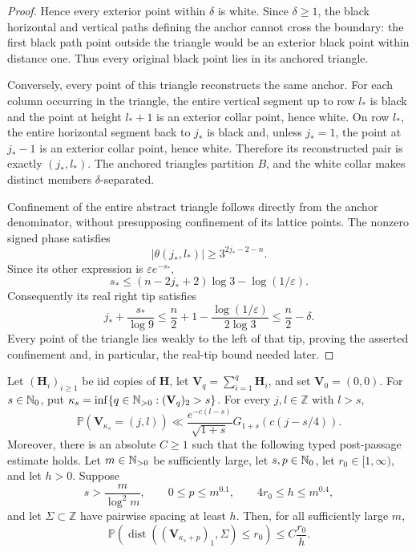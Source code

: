 \begin{proof}
Hence every exterior point within \(\delta\) is white.  Since
\(\delta\ge1\), the black horizontal and vertical paths defining the anchor
cannot cross the boundary: the first black path point outside the triangle
would be an exterior black point within distance one.  Thus every original
black point lies in its anchored triangle.

Conversely, every point of this triangle reconstructs the same anchor.
For each column occurring in the triangle, the entire vertical segment up to
row \(l_*\) is black and the point at height \(l_*+1\) is an exterior collar
point, hence white.  On row \(l_*\), the entire horizontal segment back to
\(j_*\) is black and, unless \(j_*=1\), the point at \(j_*-1\) is an
exterior collar point, hence white.  Therefore its reconstructed pair is
exactly \((j_*,l_*)\).  The anchored triangles partition \(B\), and the
white collar makes distinct members \(\delta\)-separated.

Confinement of the entire abstract triangle follows directly from the
anchor denominator, without presupposing confinement of its lattice points.
The nonzero signed phase satisfies
\[
 |\theta(j_*,l_*)|\ge3^{2j_*-2-n}.
\]
Since its other expression is \(\varepsilon e^{-s_*}\),
\[
 s_*\le(n-2j_*+2)\log3-\log(1/\varepsilon).
\]
Consequently its real right tip satisfies
\[
 j_*+\frac{s_*}{\log9}
 \le\frac n2+1-\frac{\log(1/\varepsilon)}{2\log3}
 \le\frac n2-\delta.
\]
Every point of the triangle lies weakly to the left of that tip, proving the
asserted confinement and, in particular, the real-tip bound needed later.
\end{proof}

\begin{lemma}
\label{lem:Tao-v7-first-passage-repaired}
Let \((\mathbf H_i)_{i\ge1}\) be iid copies of \(\mathbf H\), let
\(\mathbf V_q=\sum_{i=1}^q\mathbf H_i\), and set
\(\mathbf V_0=(0,0)\).  For \(s\in\mathbb{N}_{0}\), put
\(\kappa_s=\inf\{q\in\mathbb{N}_{>0}:(\mathbf V_q)_2>s\}\).  For every
\(j,l\in\mathbb Z\) with \(l>s\),
\[
 \mathbb P(\mathbf V_{\kappa_s}=(j,l))
 \ll\frac{e^{-c(l-s)}}{\sqrt{1+s}}
 G_{1+s}(c(j-s/4)).
\]
Moreover, there is an absolute \(C\ge1\) such that the following typed
post-passage estimate holds.  Let \(m\in\mathbb{N}_{>0}\) be sufficiently large,
let \(s,p\in\mathbb{N}_{0}\), let \(r_0\in[1,\infty)\), and let \(h>0\).  Suppose
\[
 s>\frac{m}{\log^2m},\qquad 0\le p\le m^{0.1},\qquad
 4r_0\le h\le m^{0.4},
\]
and let \(\Sigma\subset\mathbb Z\) have pairwise spacing at least \(h\).
Then, for all sufficiently large \(m\),
\[
 \mathbb P\!\left(
 \operatorname{dist}((\mathbf V_{\kappa_s+p})_1,\Sigma)\le r_0
 \right)\le C\frac {r_0}h.
\]
\end{lemma}

